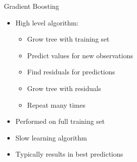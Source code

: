 \documentclass{beamer}
\begin{document}
	\begin{frame}{Gradient Boosting}
		\begin{itemize}
			\item High level algorithm:
			\begin{itemize}
				\item Grow tree with training set
				\item Predict values for new observations
				\item Find residuals for predictions
				\item Grow tree with residuals
				\item Repeat many times
			\end{itemize}
			\item Performed on full training set
			\item Slow learning algorithm
			\item Typically results in best predictions
		\end{itemize}
	\end{frame}
\end{document}
